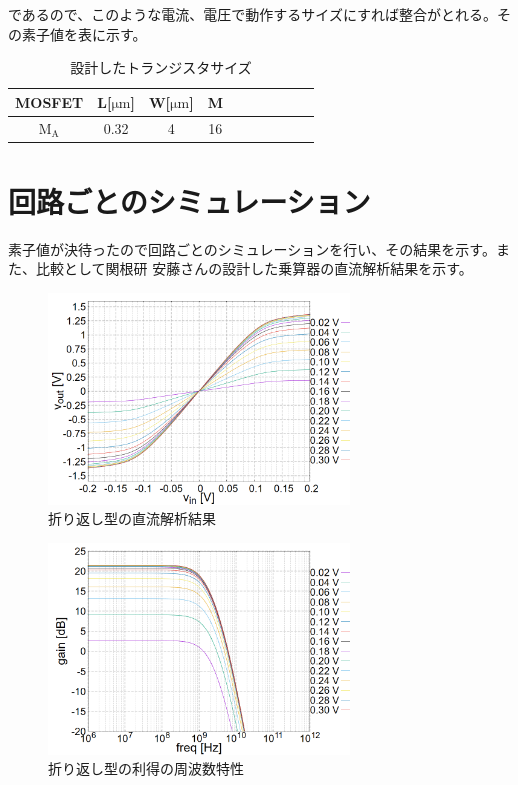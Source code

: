 \documentclass[twocolumn]{jsarticle}
\begin{document}
        であるので、このような電流、電圧で動作するサイズにすれば整合がとれる。その素子値を表に示す。
        \begin{table}[H]
            \caption{設計したトランジスタサイズ}
            \label{table:buf_size}
            \centering
            \begin{tabular}{cccccccccc}
                MOSFET & L[$\mathrm{\mu m}$] & W[$\mathrm{\mu m}$] & M\\
                \hline \hline
                $\mathrm{M_{A}}$ & 0.32 & 4 & 16 \\
            \end{tabular}
            \end{table}
                
    

\section{回路ごとのシミュレーション}
    素子値が決待ったので回路ごとのシミュレーションを行い、その結果を示す。また、比較として関根研 安藤さんの設計した乗算器の直流解析結果を示す。
    \begin{figure}[H]
        \begin{center}
            \includegraphics*[width = 80mm]{figures/NtoN_dc.PNG}
            \caption{折り返し型の直流解析結果}
            \label{fig:sim_NtoN_dc}
        \end{center}
    \end{figure}
    \begin{figure}[H]
        \begin{center}
            \includegraphics*[width = 80mm]{figures/NtoN_ac_gain.PNG}
            \caption{折り返し型の利得の周波数特性}
            \label{fig:sim_NtoN_ac_gain}
        \end{center}
    \end{figure}
\end{document}
